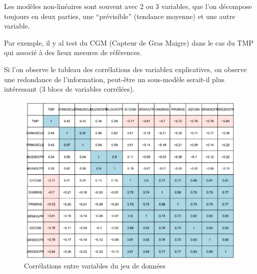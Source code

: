 \documentclass[
]{article}
\newenvironment{Shaded}{\begin{snugshade}}{\end{snugshade}}
\newcommand{\AttributeTok}[1]{\textcolor[rgb]{0.77,0.63,0.00}{#1}}
\newcommand{\DecValTok}[1]{\textcolor[rgb]{0.00,0.00,0.81}{#1}}
\newcommand{\FunctionTok}[1]{\textcolor[rgb]{0.00,0.00,0.00}{#1}}
\newcommand{\NormalTok}[1]{#1}
\newcommand{\OtherTok}[1]{\textcolor[rgb]{0.56,0.35,0.01}{#1}}
\newcommand{\SpecialCharTok}[1]{\textcolor[rgb]{0.00,0.00,0.00}{#1}}
\begin{document}
Les modèles non-linéaires sont souvent avec 2 ou 3 variables, que l'on
décompose toujours en deux parties, une ``prévisible'' (tendance
moyenne) et une autre variable.

Par exemple, il y al test du CGM (Capteur de Gras Maigre) dans le cas du
TMP qui associé à des lieux mesures de références.

Si l'on observe le tableau des corrélations des variablex explicatives,
on observe une redondance de l'information, peut-être un sous-modèle
serait-il plus intéressant (3 blocs de variables corrélées).

\begin{figure}
  \centering
  \includegraphics{Regression/Tableau-Correlation.png}
  \caption{Corrélations entre variables du jeu de données}
\end{figure}

\begin{Shaded}
\end{Shaded}
\end{document}
